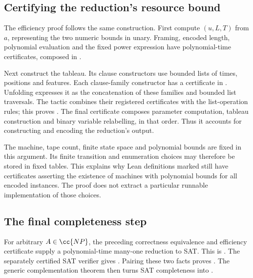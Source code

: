 \subsection{Certifying the reduction's resource bound}

The efficiency proof follows the same construction. First compute $(u,L,T)$ from
$a$, representing the two numeric bounds in unary. Framing, encoded length,
polynomial evaluation and the fixed power expression have polynomial-time
certificates, composed in
.

Next construct the tableau. Its clause constructors use bounded lists of times,
positions and features. Each clause-family constructor has a certificate in
.
Unfolding  expresses it as the concatenation of these families and
bounded list traversals. The  tactic combines their registered
certificates with the list-operation rules; this proves
.
The final certificate composes parameter computation, tableau construction and
binary variable relabelling, in that order. Thus it accounts for constructing and
encoding the reduction's output.

The machine, tape count, finite state space and polynomial bounds are fixed in
this argument. Its finite transition and enumeration choices may therefore be
stored in fixed tables. This explains why Lean definitions marked
 still have certificates asserting the existence of machines
with polynomial bounds for all encoded instances. The proof does not extract a
particular runnable implementation of those choices.

\subsection{The final completeness step}

For arbitrary $A\in\cc{NP}$, the preceding correctness equivalence and efficiency
certificate supply a polynomial-time many-one reduction to SAT. This is
.
The separately certified SAT verifier gives . Pairing these two
facts proves . The generic complementation theorem then
turns SAT completeness into .

